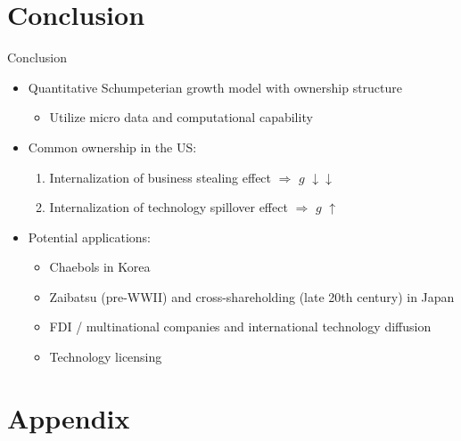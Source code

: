 \documentclass[
  10pt,
  aspectratio=169,   %
  handout           %
]{beamer}
\theoremstyle{plain}
\begin{document}
\section{Conclusion}
\begin{frame}{Conclusion}
  \begin{itemize}
    \item Quantitative Schumpeterian growth model with ownership structure
    \begin{itemize}
      \item Utilize micro data and computational capability
    \end{itemize}
    \medskip{}
    \item Common ownership in the US:
    \begin{enumerate}
      \item Internalization of business stealing effect $\Longrightarrow$ $g$ $\downarrow$$\downarrow$
      \item Internalization of technology spillover effect $\Longrightarrow$ $g$ $\uparrow$
    \end{enumerate}
    \medskip{}
    \item Potential applications:
    \begin{itemize}
      \item Chaebols in Korea
      \item Zaibatsu (pre-WWII) and cross-shareholding (late 20th century) in Japan
      \item FDI / multinational companies and international technology diffusion
      \item Technology licensing
    \end{itemize}
  \end{itemize}
\end{frame}

\appendix
\section{Appendix}
\end{document}

